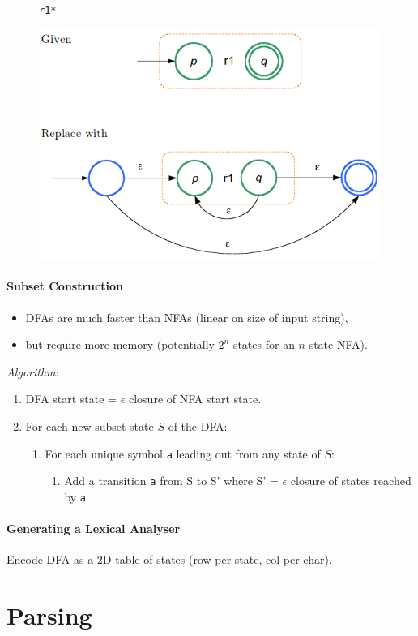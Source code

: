 \documentclass[twocolumn,english]{article}
\begin{document}
\begin{figure}[H]
\begin{centering}
\texttt{r1{*}}
\par\end{centering}
\centering{}\includegraphics[width=0.5\linewidth]{img/repeat}
\end{figure}

\paragraph{Subset Construction}
\begin{itemize}
\item DFAs are much faster than NFAs (linear on size of input string), 
\item but require more memory (potentially $2^{n}$ states for an $n$-state
NFA).
\end{itemize}
\emph{Algorithm}:
\begin{enumerate}
\item DFA start state = $\epsilon$ closure of NFA start state.
\item For each new subset state $S$ of the DFA:
\begin{enumerate}
\item For each unique symbol \texttt{a} leading out from any state of $S$:
\begin{enumerate}
\item Add a transition \texttt{a} from S to S' where S' = $\epsilon$ closure
of states reached by \texttt{a}
\end{enumerate}
\end{enumerate}
\end{enumerate}

\paragraph{Generating a Lexical Analyser}

Encode DFA as a 2D table of states (row per state, col per char).

\section{Parsing}
\end{document}
